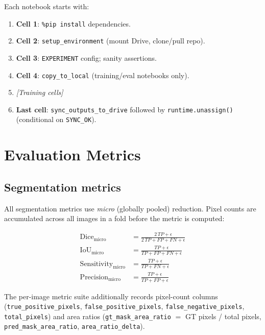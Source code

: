 \documentclass[12pt,a4paper]{article}
\begin{document}
Each notebook starts with:
\begin{enumerate}[leftmargin=1.5em]
  \item \textbf{Cell 1}: \texttt{\%pip install} dependencies.
  \item \textbf{Cell 2}: \texttt{setup\_environment} (mount Drive, clone/pull repo).
  \item \textbf{Cell 3}: \texttt{EXPERIMENT} config; sanity assertions.
  \item \textbf{Cell 4}: \texttt{copy\_to\_local} (training/eval notebooks only).
  \item \textit{[Training cells]}
  \item \textbf{Last cell}: \texttt{sync\_outputs\_to\_drive} followed by
    \texttt{runtime.unassign()} (conditional on \texttt{SYNC\_OK}).
\end{enumerate}

\section{Evaluation Metrics}

\subsection{Segmentation metrics}

All segmentation metrics use \emph{micro} (globally pooled) reduction.
Pixel counts are accumulated across all images in a fold before the metric is
computed:

\begin{align}
  \text{Dice}_\text{micro} &= \frac{2\,TP + \epsilon}{2\,TP + FP + FN + \epsilon} \\
  \text{IoU}_\text{micro}  &= \frac{TP + \epsilon}{TP + FP + FN + \epsilon} \\
  \text{Sensitivity}_\text{micro} &= \frac{TP + \epsilon}{TP + FN + \epsilon} \\
  \text{Precision}_\text{micro}   &= \frac{TP + \epsilon}{TP + FP + \epsilon}
\end{align}

The per-image metric suite additionally records pixel-count columns
(\texttt{true\_positive\_pixels}, \texttt{false\_positive\_pixels},
\texttt{false\_negative\_pixels}, \texttt{total\_pixels}) and area ratios
(\texttt{gt\_mask\_area\_ratio} $=$ GT pixels / total pixels,
\texttt{pred\_mask\_area\_ratio}, \texttt{area\_ratio\_delta}).
\end{document}
